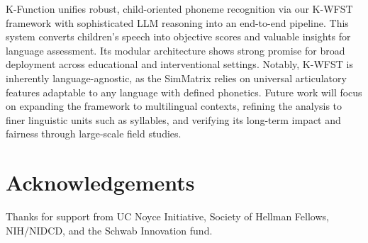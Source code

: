 K-Function unifies robust, child-oriented phoneme recognition via our K-WFST framework with sophisticated LLM reasoning into an end-to-end pipeline. This system converts children's speech into objective scores and valuable insights for language assessment. Its modular architecture shows strong promise for broad deployment across educational and interventional settings. Notably, K-WFST is inherently language-agnostic, as the SimMatrix relies on universal articulatory features adaptable to any language with defined phonetics. Future work will focus on expanding the framework to multilingual contexts, refining the analysis to finer linguistic units such as syllables, and verifying its long-term impact and fairness through large-scale field studies.

\section*{Acknowledgements}
Thanks for support from UC Noyce Initiative, Society of Hellman Fellows, NIH/NIDCD, and the Schwab Innovation fund.